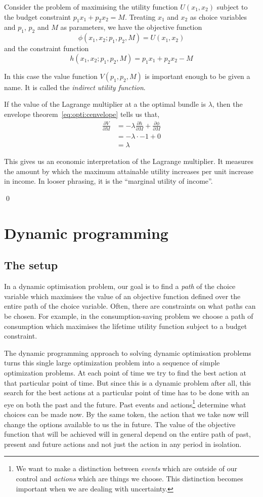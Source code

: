 \documentclass[11pt,reqno,openany]{amsbook}
\begin{document}
\begin{exmp}
Consider the problem of maximising the utility function $U(x_1,x_2)$
subject to the budget constraint $p_1x_1+p_2x_2=M$. Treating $x_1$ and
$x_2$ as choice variables and $p_1$, $p_2$ and $M$ as parameters, we
have the objective function
\[\phi(x_1,x_2;p_1,p_2,M) = U(x_1,x_2)\]
and the constraint function
\[h(x_1,x_2;p_1,p_2,M)=p_1x_1+p_2x_2-M\]

In this case the value function $V(p_1,p_2,M)$ is important enough to
be given a name. It is called the \emph{indirect utility function}.

If the value of the Lagrange multiplier at a the optimal bundle is
$\lambda$, then the envelope theorem~\eqref{eq:opti:cenvelope} tells
us that,
\begin{align*}
\frac{\partial V}{\partial M}&=
-\lambda\frac{\partial h}{\partial  M}
+\frac{\partial \phi}{\partial M}\\
&=-\lambda \cdot -1+0\\
&=\lambda
\end{align*}

This gives us an economic interpretation of the Lagrange multiplier.
It measures the amount by which the maximum attainable utility
increases per unit increase in income. In looser phrasing, it is the
``marginal utility of income''.

\qed
\end{exmp}

\chapter{Dynamic programming}
\section{The setup}
In a dynamic optimisation problem, our goal is to find a \emph{path}
of the choice variable which maximises the value of an objective
function defined over the entire path of the choice variable. Often,
there are constraints on what paths can be chosen. For example, in the
consumption-saving problem we choose a path of consumption which
maximises the lifetime utility function subject to a budget
constraint.

The dynamic programming approach to solving dynamic optimisation
problems  turns this single large optimization problem into a
sequence of simple optimization problems. At each point of time we try
to find the best action at that particular point of time. But since
this is a dynamic problem after all, this search for the best actions
at a particular point of time has to be done with an eye on both the
past and the future. Past events and actions\footnote{We want to make
  a distinction between \emph{events} which are outside of our control
  and \emph{actions} which are things we choose. This distinction
  becomes important when we are dealing with uncertainty.} determine what choices can be made now. By the
same token, the action that we take now will change the options
available to us the in future. The value of the objective function
that will be achieved will in general depend on the entire path of
past, present and future actions and not just the action in any period in
isolation.
\end{document}
